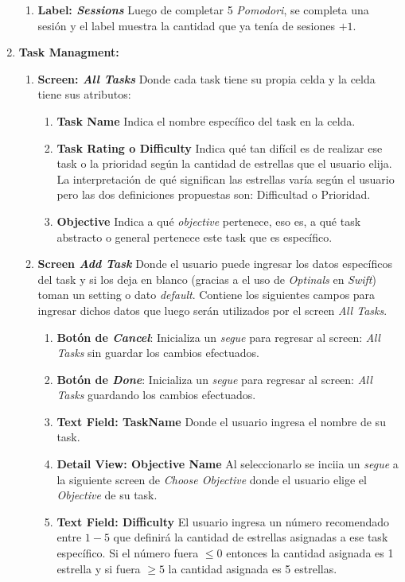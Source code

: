 \documentclass[]{article}
\begin{document}
\begin{enumerate}
\begin{enumerate}
		\item \textbf{Label: \textit{Sessions}} Luego de completar 5 \textit{Pomodori}, se completa una sesión y el label muestra la cantidad que ya tenía de sesiones $+1$.
	\end{enumerate}
	\item \textbf{Task Managment:}
	\begin{enumerate}
		\item \textbf{Screen: \textit{All Tasks}} Donde cada task tiene su propia celda y la celda tiene sus atributos:
		\begin{enumerate}
			\item \textbf{Task Name} Indica el nombre específico del task en la celda.
			\item \textbf{Task Rating o Difficulty} Indica qué tan difícil es de realizar ese task o la prioridad según la cantidad de estrellas que el usuario elija. La interpretación de qué significan las estrellas varía según el usuario pero las dos definiciones propuestas son: Difficultad o Prioridad. 
			\item \textbf{Objective} Indica a qué \textit{objective} pertenece, eso es, a qué task abstracto o general pertenece este task que es específico.
		\end{enumerate}
		\item \textbf{Screen \textit{Add Task}} Donde el usuario puede ingresar los datos específicos del task y si los deja en blanco (gracias a el uso de \textit{Optinals} en \textit{Swift}) toman un setting o dato \textit{default}. Contiene los siguientes campos para ingresar dichos datos que luego serán utilizados por el screen \textit{All Tasks}.
		\begin{enumerate}
			\item \textbf{Botón de \textit{Cancel}}: Inicializa un \textit{segue} para regresar al screen: \textit{All Tasks} sin guardar los cambios efectuados.
			\item \textbf{Botón de \textit{Done}}: Inicializa un \textit{segue} para regresar al screen: \textit{All Tasks} guardando los cambios efectuados.
			\item \textbf{Text Field: TaskName} Donde el usuario ingresa el nombre de su task.
			\item \textbf{Detail View: Objective Name} Al seleccionarlo se inciia un \textit{segue} a la siguiente screen de \textit{Choose Objective} donde el usuario elige el \textit{Objective} de su task.
			\item \textbf{Text Field: Difficulty} El usuario ingresa un número recomendado entre $1 - 5$ que definirá la cantidad de estrellas asignadas a ese task específico. Si el número fuera $\leq 0$ entonces la cantidad asignada es 1 estrella y si fuera $\geq 5$ la cantidad asignada es 5 estrellas. 
		\end{enumerate}
	\end{enumerate}
\end{enumerate}
\end{document}
